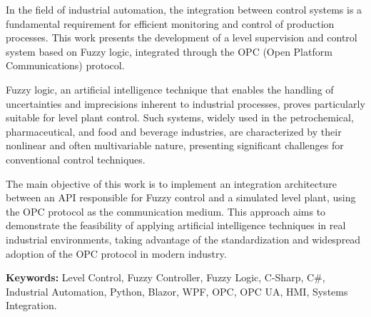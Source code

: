 \thispagestyle{empty}
\captionsenglish

\begin{resumo}


In the field of industrial automation, the integration between control systems is a fundamental requirement for efficient monitoring and control of production processes. This work presents the development of a level supervision and control system based on Fuzzy logic, integrated through the OPC (Open Platform Communications) protocol.

Fuzzy logic, an artificial intelligence technique that enables the handling of uncertainties and imprecisions inherent to industrial processes, proves particularly suitable for level plant control. Such systems, widely used in the petrochemical, pharmaceutical, and food and beverage industries, are characterized by their nonlinear and often multivariable nature, presenting significant challenges for conventional control techniques.

The main objective of this work is to implement an integration architecture between an API responsible for Fuzzy control and a simulated level plant, using the OPC protocol as the communication medium. This approach aims to demonstrate the feasibility of applying artificial intelligence techniques in real industrial environments, taking advantage of the standardization and widespread adoption of the OPC protocol in modern industry.

 \vspace{0.5cm}
 
 \textbf{Keywords:} Level Control, Fuzzy Controller, Fuzzy Logic, C-Sharp, C\#, Industrial Automation, Python, Blazor, WPF, OPC, OPC UA, HMI, Systems Integration. 
\end{resumo}
\captionsbrazil